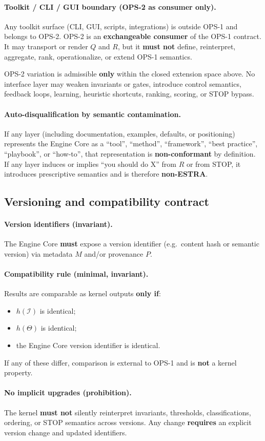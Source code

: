 \paragraph{Toolkit / CLI / GUI boundary (OPS-2 as consumer only).}
Any toolkit surface (CLI, GUI, scripts, integrations) is outside OPS-1 and
belongs to OPS-2.
OPS-2 is an \textbf{exchangeable consumer} of the OPS-1 contract.
It may transport or render $Q$ and $R$, but it \textbf{must not} define,
reinterpret, aggregate, rank, operationalize, or extend OPS-1 semantics.

OPS-2 variation is admissible \textbf{only} within the closed extension space
above.
No interface layer may weaken invariants or gates, introduce control semantics,
feedback loops, learning, heuristic shortcuts, ranking, scoring, or STOP bypass.

\paragraph{Auto-disqualification by semantic contamination.}
If any layer (including documentation, examples, defaults, or positioning)
represents the Engine Core as a ``tool'', ``method'', ``framework'',
``best practice'', ``playbook'', or ``how-to'', that representation is
\textbf{non-conformant} by definition.
If any layer induces or implies ``you should do X'' from $R$ or from STOP,
it introduces prescriptive semantics and is therefore \textbf{non-ESTRA}.

\subsection{Versioning and compatibility contract}

\paragraph{Version identifiers (invariant).}
The Engine Core \textbf{must} expose a version identifier
(e.g.\ content hash or semantic version)
via metadata $M$ and/or provenance $P$.

\paragraph{Compatibility rule (minimal, invariant).}
Results are comparable as kernel outputs \textbf{only if}:
\begin{itemize}
  \item $h(\mathcal{I})$ is identical;
  \item $h(\Theta)$ is identical;
  \item the Engine Core version identifier is identical.
\end{itemize}

If any of these differ, comparison is external to OPS-1 and is
\textbf{not} a kernel property.

\paragraph{No implicit upgrades (prohibition).}
The kernel \textbf{must not} silently reinterpret invariants, thresholds,
classifications, ordering, or STOP semantics across versions.
Any change \textbf{requires} an explicit version change and updated identifiers.
